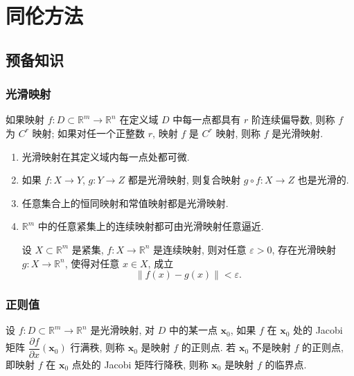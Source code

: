 \section{同伦方法}
\subsection{预备知识}
\subsubsection{光滑映射}

\begin{definition}
如果映射 \(f:D\subset\mathbb{R}^m\to\mathbb{R}^n\) 在定义域 \(D\) 中每一点都具有 \(r\) 阶连续偏导数, 则称 \(f\) 为 \(C^r\) 映射; 如果对任一个正整数 \(r\), 映射 \(f\) 是 \(C^r\) 映射, 则称 \(f\) 是光滑映射.
\end{definition}

\begin{enumerate}
    \item 光滑映射在其定义域内每一点处都可微.
    \item 如果 \(f:X\to Y\), \(g:Y\to Z\) 都是光滑映射, 则复合映射 \(g\circ f:X\to Z\) 也是光滑的.
    \item 任意集合上的恒同映射和常值映射都是光滑映射.
    \item \(\mathbb{R}^m\) 中的任意紧集上的连续映射都可由光滑映射任意逼近.
    \begin{theorem}
    设 \(X\subset\mathbb{R}^m\) 是紧集, \(f: X\to\mathbb{R}^n\) 是连续映射, 则对任意 \(\varepsilon > 0\), 存在光滑映射 \(g: X\to\mathbb{R}^n\), 使得对任意 \(x\in X\), 成立
    \begin{equation*}
        \left\lVert f(x)-g(x)\right\rVert < \varepsilon.
    \end{equation*}
    \end{theorem}
\end{enumerate}

\subsubsection{正则值}

\begin{definition}
设 \(f:D\subset\mathbb{R}^m\to\mathbb{R}^n\) 是光滑映射, 对 \(D\) 中的某一点 \(\boldsymbol{x}_0\), 如果 \(f\) 在 \(\boldsymbol{x}_0\) 处的 Jacobi 矩阵 \(\dfrac{\partial f}{\partial x}\left(\boldsymbol{x}_0\right)\) 行满秩, 则称 \(\boldsymbol{x}_0\) 是映射 \(f\) 的正则点. 若 \(\boldsymbol{x}_0\) 不是映射 \(f\) 的正则点, 即映射 \(f\) 在 \(\boldsymbol{x}_0\) 点处的 Jacobi 矩阵行降秩, 则称 \(\boldsymbol{x}_0\) 是映射 \(f\) 的临界点.
\end{definition}

